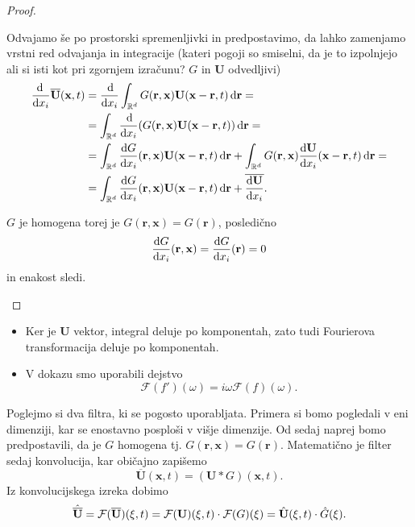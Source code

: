 \documentclass[mat2, tisk]{fmfdelo}
\newcommand{\R}{\mathbb R}
\newcommand{\bd}{\textbf}
\begin{document}
\begin{proof}
\begin{enumerate}
  Odvajamo še po prostorski spremenljivki in predpostavimo, da lahko zamenjamo vrstni red odvajanja in integracije 
  (kateri pogoji so smiselni, da je to izpolnjejo ali si isti kot pri zgornjem izračunu? $G$ in $\bd{U}$ odvedljivi) 
  \begin{align*}
  \frac{\!\!\dif}{\dif x_i} \overline{\bd{U}}(\bd{x}, t) &= \frac{\dif}{\dif x_i} \int_{\R^d} G(\bd{r}, \bd{x}) \bd{U}(\bd{x}-\bd{r}, t) \dif \bd{r} = \\
  &=  \int_{\R^d} \frac{\dif}{\dif x_i} (G(\bd{r}, \bd{x}) \bd{U}(\bd{x}-\bd{r}, t)) \dif \bd{r} = \\
  &=  \int_{\R^d} \frac{\dif G}{\dif x_i}(\bd{r}, \bd{x})  \bd{U}(\bd{x}-\bd{r}, t) \dif \bd{r} + \int_{\R^d} G(\bd{r}, \bd{x})  \frac{\dif \bd{U}}{\dif x_i}(\bd{x}-\bd{r}, t) \dif \bd{r} = \\
  &= \int_{\R^d} \frac{\dif G}{\dif x_i}(\bd{r}, \bd{x})  \bd{U}(\bd{x}-\bd{r}, t) \dif \bd{r} + \overline{\frac{\dif \bd{U}}{\dif x_i}}.
  \end{align*}

  $G$ je homogena torej je $G(\bd{r}, \bd{x}) = G(\bd{r})$, posledično 
  $$\frac{\dif G}{\dif x_i}(\bd{r}, \bd{x}) = \frac{\dif G}{\dif x_i}(\bd{r}) = 0$$
  in enakost sledi.
\end{enumerate}
\end{proof}

\begin{opomba}
  \hfill
\begin{itemize}
  \item Ker je $\bd{U}$ vektor, integral deluje po komponentah, zato tudi Fourierova transformacija deluje po komponentah. 
  \item V dokazu smo uporabili dejstvo 
  $$ \mathcal{F}(f')(\omega) =  i\omega \mathcal{F}(f)(\omega). $$
\end{itemize}
\end{opomba}

\noindent
Poglejmo si dva filtra, ki se pogosto uporabljata. Primera si bomo pogledali v eni dimenziji, 
kar se enostavno  posploši v višje dimenzije. Od sedaj naprej bomo predpostavili, da je 
$G$ homogena tj. $G(\bd{r}, \bd{x}) = G(\bd{r})$. Matematično je filter sedaj konvolucija, kar običajno 
zapišemo
\begin{equation}
\overline{\bd{U}}(\bd{x}, t) = (\bd{U} * G)(\bd{x}, t).
\end{equation}
Iz konvolucijskega izreka dobimo 
\begin{equation}
\hat{\overline{\bd{U}}} = \mathcal{F}(\overline{\bd{U}})(\bd{\text{$\xi$}}, t) = \mathcal{F}(\bd{U})(\bd{\text{$\xi$}}, t)\cdot \mathcal{F}(G)(\bd{\text{$\xi$}})= 
\hat{\bd{U}}(\bd{\text{$\xi$}}, t)\cdot \hat{G}(\bd{\text{$\xi$}}).
\end{equation}
\\[1mm] 
\end{document}
